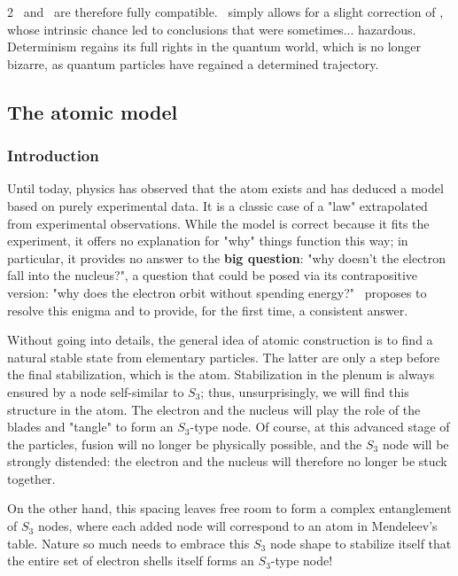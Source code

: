 \begin{multicols}{2}
	\PQ\ and \MQ\ are therefore fully compatible. \PQ\ simply allows for a slight correction of \MQ, whose intrinsic chance led to conclusions that were sometimes... hazardous. Determinism regains its full rights in the quantum world, which is no longer bizarre, as quantum particles have regained a determined trajectory.
	
	\subsection{The atomic model}
	
	\subsubsection{Introduction}
	
	Until today, physics has observed that the atom exists and has deduced a model based on purely experimental data. It is a classic case of a "law" extrapolated from experimental observations\cite{poincare:1902:sh}. While the model is correct because it fits the experiment, it offers no explanation for "why" things function this way; in particular, it provides no answer to the \textbf{big question}: "why doesn't the electron fall into the nucleus?", a question that could be posed via its contrapositive version: "why does the electron orbit without spending energy?" \PQ\ proposes to resolve this enigma and to provide, for the first time, a consistent answer.
	
	Without going into details, the general idea of atomic construction is to find a natural stable state from elementary particles. The latter are only a step before the final stabilization, which is the atom. Stabilization in the plenum is always ensured by a node self-similar to $S_3$; thus, unsurprisingly, we will find this structure in the atom. The electron and the nucleus will play the role of the blades and "tangle" to form an $S_3$-type node. Of course, at this advanced stage of the particles, fusion will no longer be physically possible, and the $S_3$ node will be strongly distended: the electron and the nucleus will therefore no longer be stuck together.
	
	On the other hand, this spacing leaves free room to form a complex entanglement of $S_3$ nodes, where each added node will correspond to an atom in Mendeleev's table. Nature so much needs to embrace this $S_3$ node shape to stabilize itself that the entire set of electron shells itself forms an $S_3$-type node!
	

\end{multicols}
